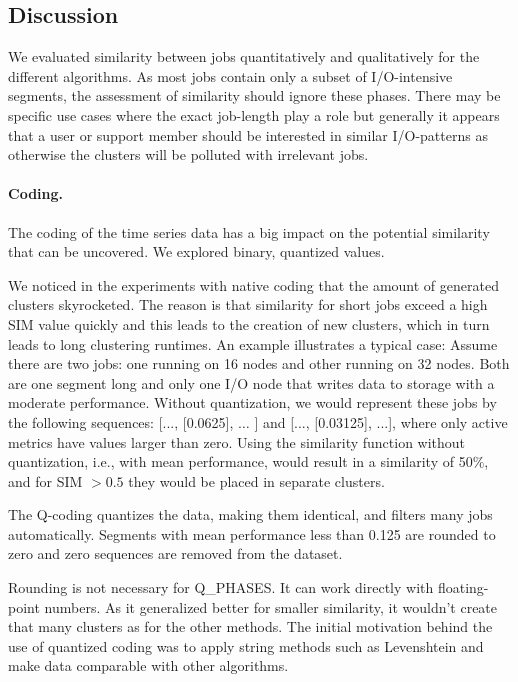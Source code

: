 \documentclass{jhps}
\begin{document}
\FloatBarrier
\subsection{Discussion}
We evaluated similarity between jobs quantitatively and qualitatively for the different algorithms.
As most jobs contain only a subset of I/O-intensive segments, the assessment of similarity should ignore these phases.
There may be specific use cases where the exact job-length play a role but generally it appears that a user or support member should be interested in similar I/O-patterns as otherwise the clusters will be polluted with  irrelevant jobs.

\paragraph{Coding.} The coding of the time series data has a big impact on the potential similarity that can be uncovered.
We explored binary, quantized values.

We noticed in the experiments with native coding that the amount of generated clusters skyrocketed.
The reason is that similarity for short jobs exceed a high SIM value quickly and this leads to the creation of new clusters, which in turn leads to long clustering runtimes.
An example illustrates a typical case:
Assume there are two jobs: one running on 16 nodes and other running on 32 nodes.
Both are one segment long and only one I/O node that writes data to storage with a moderate performance.
Without quantization, we would represent these jobs by the following sequences:  [..., [0.0625], $ \ldots $ ] and [..., [0.03125], ...], where only active metrics have values larger than zero.
Using the similarity function without quantization, i.e., with mean performance, would result in a similarity of 50$\%$, and for SIM $>0.5$ they would be placed in separate clusters.

The Q-coding quantizes the data, making them identical, and filters many jobs automatically.
Segments with mean performance less than 0.125 are rounded to zero and zero sequences are removed from the dataset.

Rounding is not necessary for Q\_PHASES.
It can work directly with floating-point numbers.
As it generalized better for smaller similarity, it wouldn't create that many clusters as for the other methods.
The initial motivation behind the use of quantized coding was to apply string methods such as Levenshtein and make data comparable with other algorithms.
\end{document}
